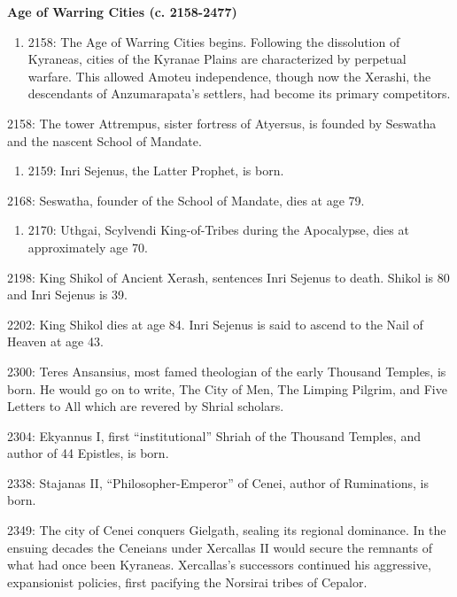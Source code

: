 \documentclass[]{book}
\providecommand{\tightlist}{%
  \setlength{\itemsep}{0pt}\setlength{\parskip}{0pt}}
\begin{document}
\textbf{Age of Warring Cities (c. 2158-2477)}

\begin{enumerate}
\def\labelenumi{\alph{enumi}.}
\setcounter{enumi}{2}
\tightlist
\item
  2158: The Age of Warring Cities begins. Following the dissolution of Kyraneas,
  cities of the Kyranae Plains are characterized by perpetual warfare. This allowed
  Amoteu independence, though now the Xerashi, the descendants of
  Anzumarapata's settlers, had become its primary competitors.
\end{enumerate}

2158: The tower Attrempus, sister fortress of Atyersus, is founded by Seswatha and
the nascent School of Mandate.

\begin{enumerate}
\def\labelenumi{\alph{enumi}.}
\setcounter{enumi}{2}
\tightlist
\item
  2159: Inri Sejenus, the Latter Prophet, is born.
\end{enumerate}

2168: Seswatha, founder of the School of Mandate, dies at age 79.

\begin{enumerate}
\def\labelenumi{\alph{enumi}.}
\setcounter{enumi}{2}
\tightlist
\item
  2170: Uthgai, Scylvendi King-of-Tribes during the Apocalypse, dies at
  approximately age 70.
\end{enumerate}

2198: King Shikol of Ancient Xerash, sentences Inri Sejenus to death. Shikol is 80
and Inri Sejenus is 39.

2202: King Shikol dies at age 84. Inri Sejenus is said to ascend to the Nail of
Heaven at age 43.

2300: Teres Ansansius, most famed theologian of the early Thousand Temples, is
born. He would go on to write, The City of Men, The Limping Pilgrim, and Five Letters to All which are revered by Shrial scholars.

2304: Ekyannus I, first ``institutional'' Shriah of the Thousand Temples, and author
of 44 Epistles, is born.

2338: Stajanas II, ``Philosopher-Emperor'' of Cenei, author of Ruminations, is born.

2349: The city of Cenei conquers Gielgath, sealing its regional dominance. In the
ensuing decades the Ceneians under Xercallas II would secure the remnants of
what had once been Kyraneas. Xercallas's successors continued his aggressive,
expansionist policies, first pacifying the Norsirai tribes of Cepalor.
\end{document}
